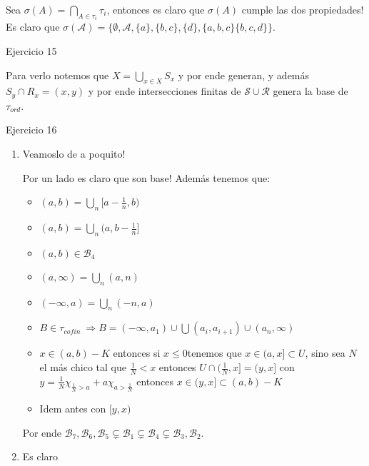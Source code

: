 \documentclass[11pt]{article}
\newcommand{\sett}[1]{\{#1\}}
\newenvironment{proof}[1][Demostraci\'on]{\begin{trivlist}
\item[\hskip \labelsep {\bfseries #1}]}{\end{trivlist}}
\newcommand{\qed}{\nobreak \ifvmode \relax \else
      \ifdim\lastskip<1.5em \hskip-\lastskip
      \hskip1.5em plus0em minus0.5em \fi \nobreak
      \vrule height0.75em width0.5em depth0.25em\fi}
\begin{document}
\begin{enumerate}
\begin{proof}
Sea $\sigma(A) = \bigcap_{A \in \tau_i}{\tau_i}$, entonces es claro que $\sigma(A)$ cumple las dos propiedades! Es claro que $\sigma(\mathcal{A}) = \sett{\emptyset,\mathcal{A},\sett{a},\sett{b,c},\sett{d},\sett{a,b,c}\sett{b,c,d}}$.
\end{proof}

\item {Ejercicio 15}

\begin{proof}
Para verlo notemos que $X = \bigcup_{x \in X}{S_x}$ y por ende generan, y adem\'as $S_y \cap R_x = (x,y)$ y por ende intersecciones finitas de $\mathcal{S} \cup \mathcal{R}$ genera la base de $\tau_{ord}$. \qed
\end{proof}

\item {Ejercicio 16}

\begin{proof}
\begin{enumerate}
\item Veamoslo de a poquito!

Por un lado es claro que son base! Adem\'as tenemos que:

\begin{itemize}

\item $(a,b) = \bigcup_{n}[a- \frac{1}{n},b)$
\item $(a,b) = \bigcup_{n} (a,b-\frac{1}{n}]$
\item $(a,b) \in \mathcal{B}_4$
\item $(a, \infty) = \bigcup_{n}(a,n)$
\item $(-\infty ,a) = \bigcup_{n}(-n,a)$
\item $B \in \tau_{cofin} \ \Longrightarrow B = (-\infty,a_1) \cup \bigcup (a_i,a_{i+1}) \cup (a_{n},\infty)$
\item $x \in (a,b) - K$ entonces si $x \leq 0$tenemos que $x \in (a,x] \subset U$, sino sea $N$ el m\'as chico tal que $\frac{1}{N} < x$ entonces $U \cap (\frac{1}{N},x] = (y,x]$ con $y = \frac{1}{N} \chi_{\frac{1}{N} > a} + a \chi_{a > \frac{1}{N}}$ entonces $x \in (y,x] \subset (a,b)-K$
\item Idem antes con $[y,x)$
\end{itemize}

Por ende $\mathcal{B}_7,\mathcal{B}_6,\mathcal{B}_5 \subsetneq \mathcal{B}_1 \subsetneq \mathcal{B}_4 \subsetneq \mathcal{B}_3,\mathcal{B}_2$.

\item Es claro


\end{enumerate}
\end{proof}
\end{enumerate}
\end{document}

